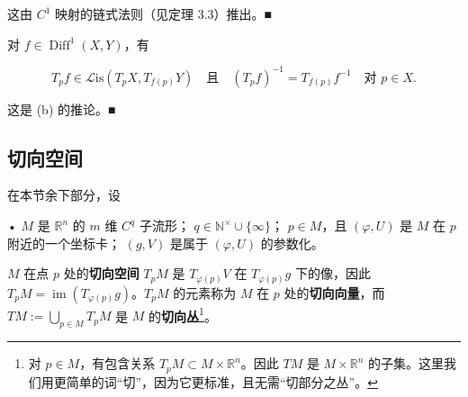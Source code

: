\begin{remark}
\begin{items}
\proofhead
这由 $ C^{1} $ 映射的链式法则（见定理 3.3）推出。\nobreak\hspace{0.35em}■
\item[（c）]

对 $ f \in \operatorname{Diff}^{1}(X,Y) $，有

\[
T_{p}f \in \mathcal{L}\mathrm{is}(T_{p}X, T_{f(p)}Y) \quad \text{且} \quad (T_{p}f)^{-1} = T_{f(p)}f^{-1} \quad \text{对 } p \in X .
\]

\proofhead
这是 (b) 的推论。\nobreak\hspace{0.35em}■
\end{items}

\end{remark}

\subsection*{切向空间}

在本节余下部分，设

• $ M $ 是 $ \mathbb{R}^{n} $ 的 $ m $ 维 $ C^{q} $ 子流形；
$ q \in \mathbb{N}^{\times} \cup \{\infty\} $；
$ p \in M $，且 $ (\varphi,U) $ 是 $ M $ 在 $ p $ 附近的一个坐标卡；
$ (g,V) $ 是属于 $ (\varphi,U) $ 的参数化。

$ M $ 在点 $ p $ 处的\textbf{切向空间} $ T_{p}M $ 是 $ T_{\varphi(p)}V $ 在 $ T_{\varphi(p)}g $ 下的像，因此 $ T_{p}M = \operatorname{im}(T_{\varphi(p)}g) $。$ T_{p}M $ 的元素称为 $ M $ 在 $ p $ 处的\textbf{切向向量}，而 $ TM := \bigcup_{p\in M}T_{p}M $ 是 $ M $ 的\textbf{切向丛}\footnote{对 $ p \in M $，有包含关系 $ T_{p}M \subset M\times\mathbb{R}^{n} $。因此 $ TM $ 是 $ M\times\mathbb{R}^{n} $ 的子集。这里我们用更简单的词“切”，因为它更标准，且无需“切部分之丛”。}。

